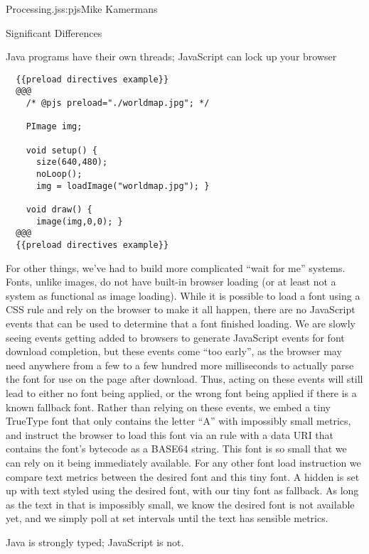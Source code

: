 \begin{aosachapter}{Processing.js}{s:pjs}{Mike Kamermans}
\begin{aosasect1}{Significant Differences}
\begin{aosasect3}{Java programs have their own threads; JavaScript can lock up your browser}
\begin{verbatim}
  {{preload directives example}}
  @@@
    /* @pjs preload="./worldmap.jpg"; */

    PImage img;

    void setup() {
      size(640,480);
      noLoop();
      img = loadImage("worldmap.jpg"); }

    void draw() {
      image(img,0,0); }
  @@@
  {{preload directives example}}
\end{verbatim}

For other things, we've had to build more complicated ``wait for me''
systems. Fonts, unlike images, do not have built-in browser loading
(or at least not a system as functional as image loading). While it is
possible to load a font using a CSS  rule and rely on
the browser to make it all happen, there are no JavaScript events that
can be used to determine that a font finished loading. We are slowly
seeing events getting added to browsers to generate JavaScript events
for font download completion, but these events come ``too early'', as
the browser may need anywhere from a few to a few hundred more
milliseconds to actually parse the font for use on the page after
download. Thus, acting on these events will still lead to either no
font being applied, or the wrong font being applied if there is a
known fallback font. Rather than relying on these events, we embed
a tiny TrueType font that only contains the letter ``A'' with
impossibly small metrics, and instruct the browser to load this font
via an  rule with a data URI that contains the font's
bytecode as a BASE64 string. This font is so small that we can rely on
it being immediately available. For any other font load
instruction we compare text metrics between the desired font and this
tiny font. A hidden  is set up with text styled using the desired
font, with our tiny font as fallback. As long as the text in that 
is impossibly small, we know the desired font is not available yet,
and we simply poll at set intervals until the
text has sensible metrics.

\end{aosasect3}

\begin{aosasect3}{Java is strongly typed; JavaScript is not.}


\end{aosasect3}
\end{aosasect1}
\end{aosachapter}
